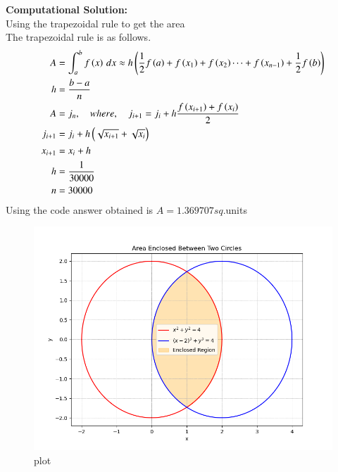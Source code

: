 \documentclass[journal]{IEEEtran}
\begin{document}
\textbf{Computational Solution:}\\
Using the trapezoidal rule to get the area\\
The trapezoidal rule is as follows.\\
\begin{align}
    A &= \int_a^b f\left(x\right)\,dx\approx h\left(\frac{1}{2}f\left(a\right)+f\left(x_1\right)+f\left(x_2\right)\dots+f\left(x_{n-1}\right)+\frac{1}{2}f\left(b\right)\right)\\
    h&=\frac{b-a}{n}\\
    A &= j_n,\quad where ,\quad j_{i+1}=j_i +h\frac{f\left(x_{i+1}\right)+f\left(x_i\right)}{2}\\
    j_{i+1}&= j_i+h\left(\sqrt{x_{i+1}}+\sqrt{x_i}\right)\\
    x_{i+1}&=x_i +h\\
    h&=\frac{1}{30000}\\
    n&=30000
\end{align}
Using the code answer obtained is $A=1.369707sq$.units 
\begin{figure}[h!]
    \centering
    \includegraphics[width=1\columnwidth]{figure/fig.png} 
    \caption{plot}
    \label{stemplot}
 \end{figure}
\end{document}
